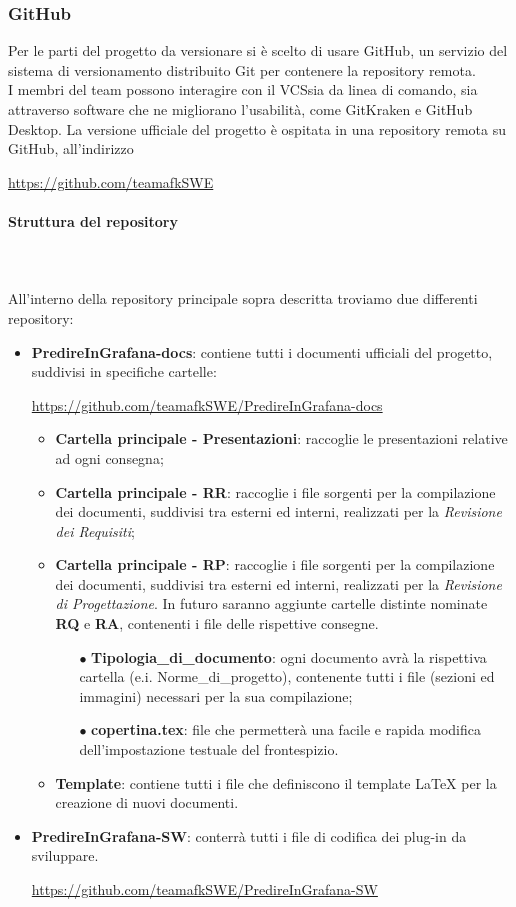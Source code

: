 \subsubsection{GitHub} 
Per le parti del progetto da versionare si è scelto di usare GitHub\glo, un servizio del sistema di versionamento distribuito Git per contenere la repository remota. \\
I membri del team possono interagire con il VCS\glo sia da linea di comando, sia attraverso software che ne migliorano l'usabilità, come GitKraken e GitHub Desktop. La versione ufficiale del progetto è ospitata in una repository remota su GitHub, all'indirizzo \\
\centerline{\url{https://github.com/teamafkSWE}}

\paragraph{Struttura del repository} \mbox{} \\ \mbox{} \\
All'interno della repository principale sopra descritta troviamo due differenti repository: \begin{itemize}
\item \textbf{PredireInGrafana-docs}: contiene tutti i documenti ufficiali del progetto, suddivisi in specifiche cartelle: \\
\centerline{\url{https://github.com/teamafkSWE/PredireInGrafana-docs}}  \begin{itemize}
\item \textbf{Cartella principale - Presentazioni}: raccoglie le presentazioni relative ad ogni consegna;
\item \textbf{Cartella principale - RR}: raccoglie i file sorgenti per la compilazione dei documenti, suddivisi tra esterni ed interni, realizzati per la \textit{Revisione dei Requisiti};
\item \textbf{Cartella principale - RP}: raccoglie i file sorgenti per la compilazione dei documenti, suddivisi tra esterni ed interni, realizzati per la \textit{Revisione di Progettazione}. In futuro saranno aggiunte cartelle distinte nominate \textbf{RQ} e \textbf{RA}, contenenti i file delle rispettive consegne.
\begin{itemize}
\item[$\bullet$] \textbf{Tipologia\_di\_documento}: ogni documento avrà la rispettiva cartella (e.i. Norme\_di\_progetto), contenente tutti i file (sezioni ed immagini) necessari per la sua compilazione;
\item[$\bullet$] \textbf{copertina.tex}: file che permetterà una facile e rapida modifica dell'impostazione testuale del frontespizio.
\end{itemize}
\item \textbf{Template}: contiene tutti i file che definiscono il template \LaTeX{} per la creazione di nuovi documenti.
\end{itemize} 
\item \textbf{PredireInGrafana-SW}: conterrà tutti i file di codifica dei plug-in da sviluppare. \\ \centerline{\url{https://github.com/teamafkSWE/PredireInGrafana-SW}}
\end{itemize}
